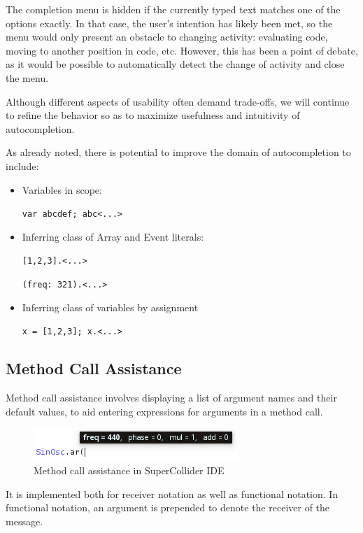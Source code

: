 \documentclass[11pt,a4paper]{article}
\begin{document}
The completion menu is hidden if the currently typed text matches one of the options exactly. In
that case, the user's intention has likely been met, so the menu would only present an obstacle to
changing activity: evaluating code, moving to another position in code, etc. However, this has been
a point of debate, as it would be possible to automatically detect the change of activity and close
the menu.

Although different aspects of usability often demand trade-offs, we will continue to refine the
behavior so as to maximize usefulness and intuitivity of autocompletion.

As already noted, there is potential to improve the domain of autocompletion to include:
\begin{itemize}
 \item Variables in scope:

 \verb|var abcdef; abc<...>|

 \item Inferring class of Array and Event literals:

 \verb|[1,2,3].<...>|

 \verb|(freq: 321).<...>|

 \item Inferring class of variables by assignment

 \verb|x = [1,2,3]; x.<...>|

\end{itemize}

\subsection{Method Call Assistance}
\label{method-call-assistance}

Method call assistance involves displaying a list of argument names and their default values, to aid
entering expressions for arguments in a method call.

\begin{figure}[h]
  \includegraphics{method_call_aid}
  \caption{Method call assistance in SuperCollider IDE}
  \label{fig:method_call_aid}
\end{figure}

It is implemented both for receiver notation as well as functional notation. In functional notation,
an argument is prepended to denote the receiver of the message.
\end{document}
